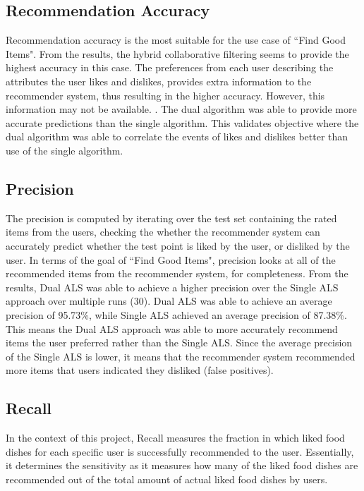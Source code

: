 \subsection{Recommendation Accuracy}
Recommendation accuracy is the most suitable for the use case of ``Find Good Items". From the results, the hybrid collaborative filtering seems to provide the highest accuracy in this case. The preferences from each user describing the attributes the user likes and dislikes, provides extra information to the recommender system, thus resulting in the higher accuracy. However, this information may not be available. . The dual algorithm was able to provide more accurate predictions than the single algorithm. This validates objective  where the dual algorithm was able to correlate the events of likes and dislikes better than use of the single algorithm.

\subsection{Precision}
The precision is computed by iterating over the test set containing the rated items from the users, checking the whether the recommender system can accurately predict whether the test point is liked by the user, or disliked by the user. In terms of the goal of ``Find Good Items", precision looks at all of the recommended items from the recommender system, for completeness. From the results, Dual ALS was able to achieve a higher precision over the Single ALS approach over multiple runs (30). Dual ALS was able to achieve an average precision of 95.73\%, while Single ALS achieved an average precision of 87.38\%. This means the Dual ALS approach was able to more accurately recommend items the user preferred rather than the Single ALS. Since the average precision of the Single ALS is lower, it means that the recommender system recommended more items that users indicated they disliked (false positives).

\subsection{Recall}
In the context of this project, Recall measures the fraction in which liked food dishes for each specific user is successfully recommended to the user. Essentially, it determines the sensitivity as it measures how many of the liked food dishes are recommended out of the total amount of actual liked food dishes by users.  


